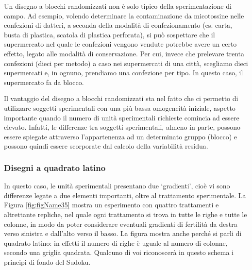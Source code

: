 \documentclass[a4paper,12pt,oneside]{book}
\begin{document}
Un disegno a blocchi randomizzati non è solo tipico della sperimentazione di campo. Ad esempio, volendo determinare la contaminazione da micotossine nelle confezioni di datteri, a seconda della modalità di confezionamento (es. carta, busta di plastica, scatola di plastica perforata), si può sospettare che il supermercato nel quale le confezioni vengono vendute potrebbe avere un certo effetto, legato alle modalità di conservazione. Per cui, invece che prelevare trenta confezioni (dieci per metodo) a caso nei supermercati di una città, scegliamo dieci supermercati e, in ognuno, prendiamo una confezione per tipo. In questo caso, il supermercato fa da blocco.

Il vantaggio del disegno a blocchi randomizzati sta nel fatto che ci permetto di utilizzare soggetti sperimentali con una più bassa omogeneità iniziale, aspetto importante quando il numero di unità sperimentali richieste comincia ad essere elevato. Infatti, le differenze tra soggetti sperimentali, almeno in parte, possono essere spiegate attraverso l'appartenenza ad un determinato gruppo (blocco) e possono quindi essere scorporate dal calcolo della variabilità residua.

\hypertarget{disegni-a-quadrato-latino}{%
\subsubsection{Disegni a quadrato latino}\label{disegni-a-quadrato-latino}}

In questo caso, le unità sperimentali presentano due `gradienti', cioè vi sono differenze legate a due elementi importanti, oltre al trattamento sperimentale. La Figura \ref{fig:figName35} mostra un esperimento con quattro trattamenti e altrettante repliche, nel quale ogni trattamento si trova in tutte le righe e tutte le colonne, in modo da poter considerare eventuali gradienti di fertilità da destra verso sinistra e dall'alto verso il basso. La figura mostra anche perché si parli di quadrato latino: in effetti il numero di righe è uguale al numero di colonne, secondo una griglia quadrata. Qualcuno di voi riconoscerà in questo schema i principi di fondo del Sudoku.
\end{document}
